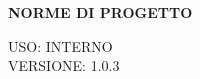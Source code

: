 \documentclass[5pt]{article}
\begin{document}
\vspace{24pt}

\begin{center}
	\textbf{\Large NORME DI PROGETTO }
\end{center}

\vspace{13pt}

\begin{flushright}
	\begin{spacing}{1}
		USO: INTERNO\\
		VERSIONE: 1.0.3\\
	\end{spacing}
\end{flushright}


\restoregeometry

\pagebreak


\pagebreak
\end{document}
